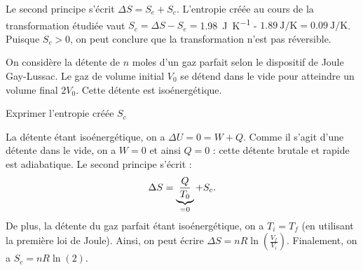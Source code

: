  
\begin{corrige}
Le second principe s'écrit $\Delta S = S_e+S_c$. 
L'entropie créée au cours de la transformation étudiée vaut $S_c=\Delta S-S_e=  $\SI{1,98}{\joule\per\kelvin} - $\SI{1,89}{\joule\per\kelvin}=\SI{0,09}{\joule\per\kelvin}$. Puisque $S_c>0$, on peut conclure que la transformation n'est pas réversible.
\end{corrige}
 
 
\finEntrainement





\hauteurLargeurCadreReponse		{8mm}{3.5cm}
\initialisationEntrainement

On considère la détente de $n$ moles d'un gaz parfait selon le dispositif de Joule Gay-Lussac. Le gaz de volume initial $V_0$ se détend dans le vide pour atteindre un volume final $2V_0$. Cette détente est isoénergétique.

\debutEntrainement


\begin{enonce}
	Exprimer l'entropie créée $S_c$
\end{enonce}


\begin{corrige}
La détente étant isoénergétique, on a $\Delta U = 0=W+Q$. Comme il s'agit d'une détente dans le vide, on a $W=0$ et ainsi $Q=0$ : cette détente brutale et rapide est adiabatique. Le second principe s'écrit : 
\[
\Delta S = \underbrace{\frac{Q}{T_0}}_{=0}+S_c. \vspace{-2mm}
\]
De plus, la détente du gaz parfait étant isoénergétique, on a $T_i=T_f$ (en utilisant la première loi de Joule). Ainsi, on peut écrire $\Delta S=nR\ln\left(\frac{V_f}{V_i}\right)$. 
Finalement, on a $S_c=nR\ln(2)$.
\end{corrige}

